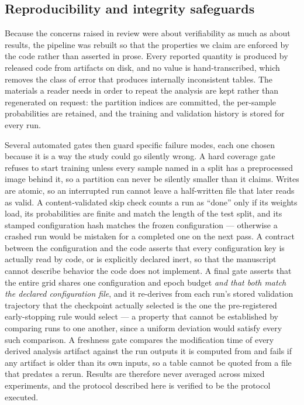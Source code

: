 \documentclass{ieeeaccess}
\begin{document}
\subsection{Reproducibility and integrity safeguards}\label{sec:repro}
Because the concerns raised in review were about verifiability as much as about results, the
pipeline was rebuilt so that the properties we claim are enforced by the code rather than asserted
in prose. Every reported quantity is produced by released code from artifacts on disk, and no value
is hand-transcribed, which removes the class of error that produces internally inconsistent tables.
The materials a reader needs in order to repeat the analysis are kept rather than regenerated on
request: the partition indices are committed, the per-sample probabilities are retained, and the
training and validation history is stored for every run.

Several automated gates then guard specific failure modes, each one chosen because it is a way the
study could go silently wrong. A hard coverage gate refuses to start training unless every sample
named in a split has a preprocessed image behind it, so a partition can never be silently smaller
than it claims. Writes are atomic, so an interrupted run cannot leave a half-written file that later
reads as valid. A content-validated skip check counts a run as ``done'' only if its weights load,
its probabilities are finite and match the length of the test split, and its stamped configuration
hash matches the frozen configuration --- otherwise a crashed run would be mistaken for a completed
one on the next pass. A contract between the configuration and the code asserts that every
configuration key is actually read by code, or is explicitly declared inert, so that the manuscript
cannot describe behavior the code does not implement. A final gate asserts that the
entire grid shares one configuration and epoch budget \emph{and that both match the declared
configuration file}, and it re-derives from each run's stored validation trajectory that the
checkpoint actually selected is the one the pre-registered early-stopping rule would select --- a
property that cannot be established by comparing runs to one another, since a uniform deviation
would satisfy every such comparison. A freshness gate compares the modification time of every
derived analysis artifact against the run outputs it is computed from and fails if any artifact is
older than its own inputs, so a table cannot be quoted from a file that predates a rerun. Results
are therefore never averaged across mixed experiments, and the protocol described here is verified
to be the protocol executed.
\end{document}
